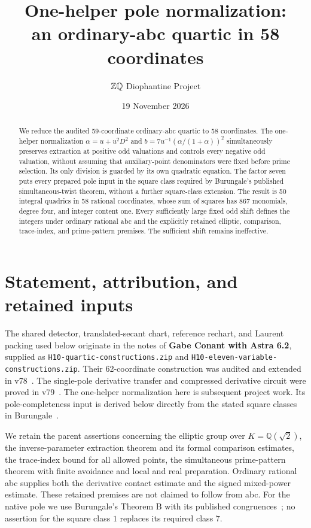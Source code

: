 \documentclass[11pt,a4paper]{article}
\title{One-helper pole normalization:\\an ordinary-abc quartic in 58 coordinates}
\author{\(\Z\Q\) Diophantine Project}
\date{19 November 2026}
\newcommand{\Q}{\mathbb Q}\newcommand{\Z}{\mathbb Z}
\begin{document}
\maketitle
\begin{abstract}
We reduce the audited 59-coordinate ordinary-abc quartic to 58 coordinates.
The one-helper normalization $\alpha=u+u^2D^2$ and
$b=7u^{-1}(\alpha/(1+\alpha))^2$ simultaneously preserves extraction at
positive odd valuations and controls every negative odd valuation,
without assuming that auxiliary-point denominators were fixed before prime
selection. Its only division is guarded by its own quadratic equation.
The factor seven puts every prepared pole input in the square class required
by Burungale's published simultaneous-twist theorem, without a further
square-class extension. The result is 50 integral quadrics in 58 rational
coordinates, whose sum of squares has 867 monomials, degree four, and
integer content one. Every sufficiently large fixed odd shift defines the
integers under ordinary rational abc and the explicitly retained elliptic,
comparison, trace-index, and prime-pattern premises. The sufficient shift
remains ineffective.
\end{abstract}

\section{Statement, attribution, and retained inputs}

The shared detector, translated-secant chart, reference rechart, and
Laurent packing used below originate in the notes of \textbf{Gabe Conant
with Astra 6.2}, supplied as \texttt{H10-quartic-constructions.zip} and
\texttt{H10-eleven-variable-constructions.zip}. Their 62-coordinate
construction was audited and extended in v78~\cite{Conant,v78}.
The single-pole derivative transfer and compressed derivative circuit were
proved in v79~\cite{v79}. The one-helper normalization here is subsequent
project work. Its pole-completeness input is derived below directly from
the stated square classes in Burungale~\cite[Theorem B]{Burungale}.

We retain the parent assertions concerning the elliptic group over
$K=\Q(\sqrt2)$, the inverse-parameter extraction theorem and its formal
comparison estimates, the trace-index bound for all allowed points, the
simultaneous prime-pattern theorem with finite avoidance and local and
real preparation. Ordinary rational abc supplies both the derivative
contact estimate and the signed mixed-power estimate. These retained
premises are not claimed to follow from abc. For the native pole we use
Burungale's Theorem B with its published congruences~\cite{Burungale};
no assertion for the square class $1$ replaces its required class $7$.
\end{document}
